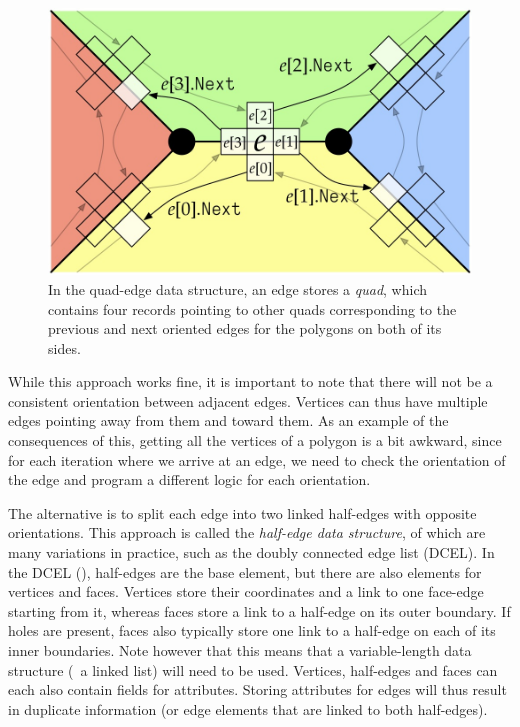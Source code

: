 \begin{figure}
\centering
\includegraphics[width=0.7\linewidth]{figs/quad}
\caption{In the quad-edge data structure, an edge stores a \emph{quad}, which contains four records pointing to other quads corresponding to the previous and next oriented edges for the polygons on both of its sides.}%
\label{fig:quad}
\end{figure}

While this approach works fine, it is important to note that there will not be a consistent orientation between adjacent edges.
Vertices can thus have multiple edges pointing away from them and toward them.
As an example of the consequences of this, getting all the vertices of a polygon is a bit awkward, since for each iteration where we arrive at an edge, we need to check the orientation of the edge and program a different logic for each orientation.

The alternative is to split each edge into two linked half-edges with opposite orientations.
This approach is called the \emph{half-edge data structure}, of which are many variations in practice, such as the doubly connected edge list (DCEL).
In the DCEL (), half-edges are the base element, but there are also elements for vertices and faces.
Vertices store their coordinates and a link to one face-edge starting from it, whereas faces store a link to a half-edge on its outer boundary.
If holes are present, faces also typically store one link to a half-edge on each of its inner boundaries.
Note however that this means that a variable-length data structure (\eg\ a linked list) will need to be used.
Vertices, half-edges and faces can each also contain fields for attributes.
Storing attributes for edges will thus result in duplicate information (or edge elements that are linked to both half-edges).


